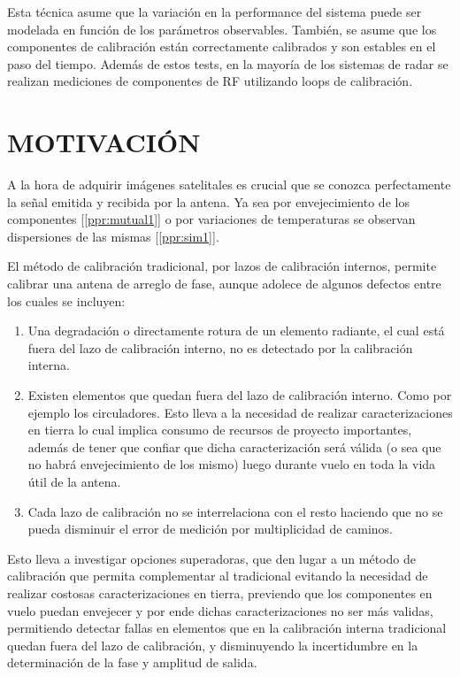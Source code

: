 \documentclass[a4paper,10pt]{article}
\begin{document}
Esta técnica asume que la variación en la performance del sistema puede ser 
modelada en función de los parámetros observables.  También, se asume que los 
componentes de calibración están correctamente calibrados y son estables en el 
paso del tiempo. Además de estos tests, en la mayoría de los sistemas de radar 
se realizan mediciones de componentes de RF utilizando loops de calibración.
		
\section{MOTIVACIÓN}

A la hora de adquirir imágenes satelitales es crucial que se conozca 
perfectamente la señal emitida y recibida por la antena. Ya sea por 
envejecimiento de los componentes [\ref{ppr:mutual1}] o por variaciones de 
temperaturas se observan dispersiones de las mismas [\ref{ppr:sim1}]. 


El método de calibración tradicional, por lazos de calibración internos, permite
calibrar una antena de arreglo de fase, aunque adolece de algunos defectos entre
los cuales se incluyen:

\begin{enumerate}
    \item Una degradación o directamente rotura de un elemento radiante, el cual
está fuera del lazo de calibración interno, no es detectado por la calibración 
interna.
    \item Existen elementos que quedan fuera del lazo de calibración interno. 
Como por ejemplo los circuladores. Esto lleva a la necesidad de realizar 
caracterizaciones en tierra lo cual implica consumo de recursos de proyecto 
importantes, además de tener que confiar que dicha caracterización será válida 
(o sea que no habrá envejecimiento de los mismo) luego durante vuelo en toda la
vida útil de la antena.
    \item Cada lazo de calibración no se interrelaciona con el resto haciendo 
que no se pueda disminuir el error de medición por multiplicidad de caminos.
\end{enumerate}

Esto lleva a investigar opciones superadoras, que den lugar a un método de 
calibración que permita complementar al tradicional evitando la necesidad de 
realizar costosas caracterizaciones en tierra, previendo que los componentes en
vuelo puedan envejecer y por ende dichas caracterizaciones no ser más validas, 
permitiendo detectar fallas en elementos que en la calibración interna 
tradicional quedan fuera del lazo de calibración, y disminuyendo la 
incertidumbre en la determinación de la fase y amplitud de salida.
\end{document}
